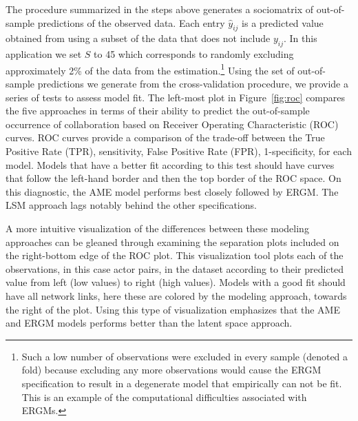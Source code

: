 The procedure summarized in the steps above generates a sociomatrix of out-of-sample predictions of the observed data. Each entry $\hat y_{ij}$ is a predicted value obtained from using a subset of the data that does not include $y_{ij}$. In this application we set $S$ to 45 which corresponds to randomly excluding approximately 2\% of the data from the estimation.\footnote{Such a low number of observations were excluded in every sample (denoted a fold) because excluding any more observations would cause the ERGM specification to result in a degenerate model that empirically can not be fit. This is an example of the computational difficulties associated with ERGMs.} Using the set of out-of-sample predictions we generate from the cross-validation procedure, we provide a series of tests to assess model fit. The left-most plot in Figure~\ref{fig:roc} compares the five approaches in terms of their ability to predict the out-of-sample occurrence of collaboration based on Receiver Operating Characteristic (ROC) curves. ROC curves provide a comparison of the trade-off between the True Positive Rate (TPR), sensitivity, False Positive Rate (FPR), 1-specificity, for each model. Models that have a better fit according to this test should have curves that follow the left-hand border and then the top border of the ROC space. On this diagnostic, the AME model performs best closely followed by ERGM. The LSM approach lags notably behind the other specifications. 

A more intuitive visualization of the differences between these modeling approaches can be gleaned through examining the separation plots included on the right-bottom edge of the ROC plot. This visualization tool plots each of the observations, in this case actor pairs, in the dataset according to their predicted value from left (low values) to right (high values). Models with a good fit should have all network links, here these are colored by the modeling approach, towards the right of the plot. Using this type of visualization emphasizes that the AME and ERGM models performs better than the latent space approach.

